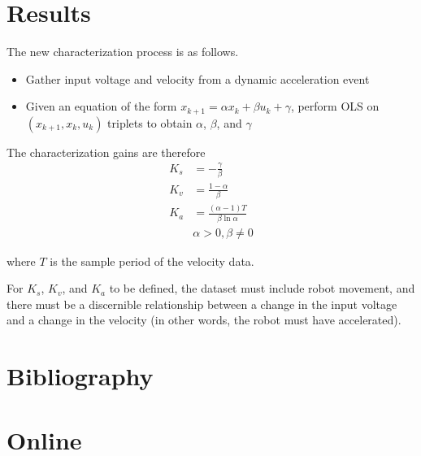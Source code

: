 \documentclass[10pt,conference,compsoc]{IEEEtran}
\begin{document}
\section{Results}

The new characterization process is as follows.
\begin{itemize}
  \item Gather input voltage and velocity from a dynamic acceleration event
  \item Given an equation of the form
    $x_{k+1} = \alpha x_k + \beta u_k + \gamma$, perform OLS on
    $(x_{k+1}, x_k, u_k)$ triplets to obtain $\alpha$, $\beta$, and $\gamma$
\end{itemize}

The characterization gains are therefore
\begin{align}
  K_s &= -\frac{\gamma}{\beta} \\
  K_v &= \frac{1 - \alpha}{\beta} \\
  K_a &= \frac{(\alpha - 1) T}{\beta \ln\alpha} \\
      &\alpha > 0, \beta \neq 0 \nonumber
\end{align}

where $T$ is the sample period of the velocity data.

For $K_s$, $K_v$, and $K_a$ to be defined, the dataset must include robot
movement, and there must be a discernible relationship between a change in the
input voltage and a change in the velocity (in other words, the robot must have
accelerated).

\section{Bibliography}

\section*{Online}
\printbibliography[heading=bibempty,type=online]
\end{document}
